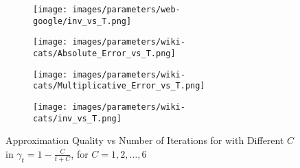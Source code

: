 {\begin{figure*}[bp]
\begin{subfigure}[b]{\textwidth}
\begin{minipage}[b]{0.3\textwidth}
			\texttt{[image: images/parameters/web-google/inv\_vs\_T.png]} %
		\end{minipage}
	\end{subfigure}
	\begin{subfigure}[b]{\textwidth}
		\centering
		\begin{minipage}[b]{0.05\textwidth}
			\centering
		\end{minipage}%
		\begin{minipage}[b]{0.3\textwidth}
			\centering
			\texttt{[image: images/parameters/wiki-cats/Absolute\_Error\_vs\_T.png]} %
			
		\end{minipage}%
		\begin{minipage}[b]{0.3\textwidth}
			\centering
			
			\texttt{[image: images/parameters/wiki-cats/Multiplicative\_Error\_vs\_T.png]} %
			
		\end{minipage}%
		\begin{minipage}[b]{0.3\textwidth}
			\centering
			
			\texttt{[image: images/parameters/wiki-cats/inv\_vs\_T.png]} %
		\end{minipage}
	\end{subfigure}
	\caption{Approximation Quality vs Number of Iterations for \prexp with Different $C$ in 
	$\gamma_t = 1 - \frac{C}{t+C}$, for $C = 1, 2, \ldots, 6$
	}
	\label{fig:parameter_normal_graphs}
\end{figure*}

}


